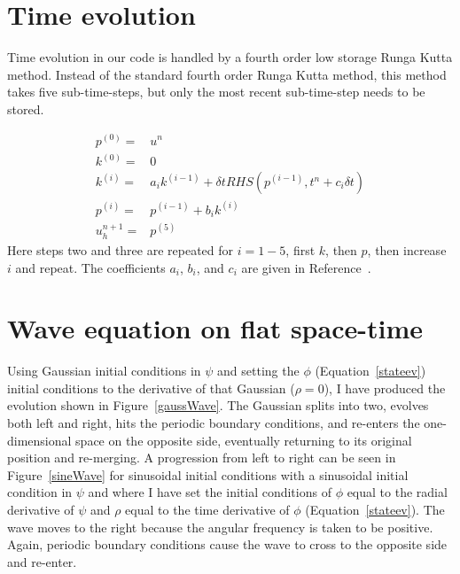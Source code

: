\section{Time evolution}

Time evolution in our code is handled by a fourth order low storage Runga Kutta method. Instead of the standard fourth order Runga Kutta method, this method takes five sub-time-steps, but only the most recent sub-time-step needs to be stored.

\begin{eqnarray}
  p^{(0)}=&u^n\nonumber\\
  k^{(0)}=&0\nonumber\\
  k^{(i)}=&a_ik^{(i-1)}+\delta t RHS(p^{(i-1)},t^n+c_i\delta t)\nonumber\\
  p^{(i)}=&p^{(i-1)}+b_ik^{(i)}\nonumber\\
  u_h^{n+1}=&p^{(5)}
\end{eqnarray}
Here steps two and three are repeated for $i=1-5$, first $k$, then $p$, then increase $i$ and repeat. The coefficients $a_i$, $b_i$, and $c_i$ are given in Reference~\cite{dghesthaven}.

\section{Wave equation on flat space-time}

Using Gaussian initial conditions in $\psi$ and setting the $\phi$ (Equation~\ref{stateev}) initial conditions to the derivative of that Gaussian ($\rho=0$), I have produced the evolution shown in Figure~\ref{gaussWave}. The Gaussian splits into two, evolves both left and right, hits the periodic boundary conditions, and re-enters the one-dimensional space on the opposite side, eventually returning to its original position and re-merging. A progression from left to right can be seen in Figure~\ref{sineWave} for sinusoidal initial conditions with a sinusoidal initial condition in $\psi$ and where I have set the initial conditions of $\phi$ equal to the radial derivative of $\psi$  and $\rho$ equal to the time derivative of $\phi$ (Equation~\ref{stateev}). The wave moves to the right because the angular frequency is taken to be positive. Again, periodic boundary conditions cause the wave to cross to the opposite side and re-enter.

